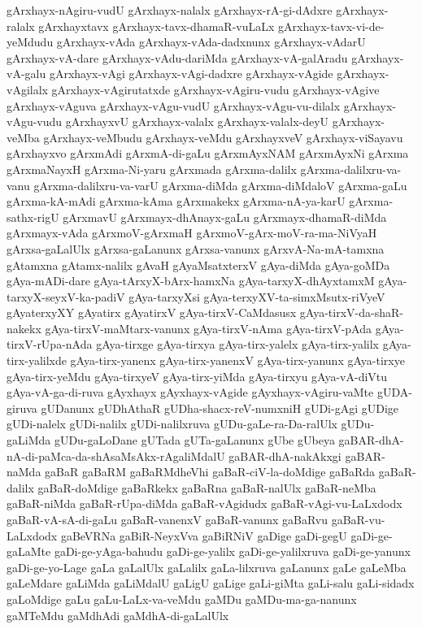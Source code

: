 {gArxhayx-nAgiru-vudU
gArxhayx-nalalx
gArxhayx-rA-gi-dAdxre
gArxhayx-ralalx
gArxhayxtavx
gArxhayx-tavx-dhamaR-vuLaLx
gArxhayx-tavx-vi-de-yeMdudu
gArxhayx-vAda
gArxhayx-vAda-dadxnunx
gArxhayx-vAdarU
gArxhayx-vA-dare
gArxhayx-vAdu-dariMda
gArxhayx-vA-galAradu
gArxhayx-vA-galu
gArxhayx-vAgi
gArxhayx-vAgi-dadxre
gArxhayx-vAgide
gArxhayx-vAgilalx
gArxhayx-vAgirutatxde
gArxhayx-vAgiru-vudu
gArxhayx-vAgive
gArxhayx-vAguva
gArxhayx-vAgu-vudU
gArxhayx-vAgu-vu-dilalx
gArxhayx-vAgu-vudu
gArxhayxvU
gArxhayx-valalx
gArxhayx-valalx-deyU
gArxhayx-veMba
gArxhayx-veMbudu
gArxhayx-veMdu
gArxhayxveV
gArxhayx-viSayavu
gArxhayxvo
gArxmAdi
gArxmA-di-gaLu
gArxmAyxNAM
gArxmAyxNi
gArxma
gArxmaNayxH
gArxma-Ni-yaru
gArxmada
gArxma-dalilx
gArxma-dalilxru-va-vanu
gArxma-dalilxru-va-varU
gArxma-diMda
gArxma-diMdaloV
gArxma-gaLu
gArxma-kA-mAdi
gArxma-kAma
gArxmakekx
gArxma-nA-ya-karU
gArxma-sathx-rigU
gArxmavU
gArxmayx-dhAnayx-gaLu
gArxmayx-dhamaR-diMda
gArxmayx-vAda
gArxmoV-gArxmaH
gArxmoV-gArx-moV-ra-ma-NiVyaH
gArxsa-gaLalUlx
gArxsa-gaLanunx
gArxsa-vanunx
gArxvA-Na-mA-tamxna
gAtamxna
gAtamx-nalilx
gAvaH
gAyaMsatxterxV
gAya-diMda
gAya-goMDa
gAya-mADi-dare
gAya-tArxyX-bArx-hamxNa
gAya-tarxyX-dhAyxtamxM
gAya-tarxyX-seyxV-ka-padiV
gAya-tarxyXsi
gAya-terxyXV-ta-simxMsutx-riVyeV
gAyaterxyXY
gAyatirx
gAyatirxV
gAya-tirxV-CaMdasusx
gAya-tirxV-da-shaR-nakekx
gAya-tirxV-maMtarx-vanunx
gAya-tirxV-nAma
gAya-tirxV-pAda
gAya-tirxV-rUpa-nAda
gAya-tirxge
gAya-tirxya
gAya-tirx-yalelx
gAya-tirx-yalilx
gAya-tirx-yalilxde
gAya-tirx-yanenx
gAya-tirx-yanenxV
gAya-tirx-yanunx
gAya-tirxye
gAya-tirx-yeMdu
gAya-tirxyeV
gAya-tirx-yiMda
gAya-tirxyu
gAya-vA-diVtu
gAya-vA-ga-di-ruva
gAyxhayx
gAyxhayx-vAgide
gAyxhayx-vAgiru-vaMte
gUDA-giruva
gUDanunx
gUDhAthaR
gUDha-shacx-reV-numxniH
gUDi-gAgi
gUDige
gUDi-nalelx
gUDi-nalilx
gUDi-nalilxruva
gUDu-gaLe-ra-Da-ralUlx
gUDu-gaLiMda
gUDu-gaLoDane
gUTada
gUTa-gaLanunx
gUbe
gUbeya
gaBAR-dhA-nA-di-paMca-da-shAsaMsAkx-rAgaliMdalU
gaBAR-dhA-nakAkxgi
gaBAR-naMda
gaBaR
gaBaRM
gaBaRMdheVhi
gaBaR-ciV-la-doMdige
gaBaRda
gaBaR-dalilx
gaBaR-doMdige
gaBaRkekx
gaBaRna
gaBaR-nalUlx
gaBaR-neMba
gaBaR-niMda
gaBaR-rUpa-diMda
gaBaR-vAgidudx
gaBaR-vAgi-vu-LaLxdodx
gaBaR-vA-sA-di-gaLu
gaBaR-vanenxV
gaBaR-vanunx
gaBaRvu
gaBaR-vu-LaLxdodx
gaBeVRNa
gaBiR-NeyxVva
gaBiRNiV
gaDige
gaDi-gegU
gaDi-ge-gaLaMte
gaDi-ge-yAga-bahudu
gaDi-ge-yalilx
gaDi-ge-yalilxruva
gaDi-ge-yanunx
gaDi-ge-yo-Lage
gaLa
gaLalUlx
gaLalilx
gaLa-lilxruva
gaLanunx
gaLe
gaLeMba
gaLeMdare
gaLiMda
gaLiMdalU
gaLigU
gaLige
gaLi-giMta
gaLi-salu
gaLi-sidadx
gaLoMdige
gaLu
gaLu-LaLx-va-veMdu
gaMDu
gaMDu-ma-ga-nanunx
gaMTeMdu
gaMdhAdi
gaMdhA-di-gaLalUlx
}
